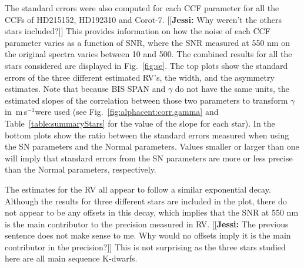 \documentclass{aa}
\def\ms{\hbox{\,m\,s$^{-1}$}}         %
\newcommand{\jessi}[1]{{\color{Purple}[[\textbf{Jessi: }#1]]}}
\begin{document}
The standard errors were also computed for each CCF parameter for all the CCFs of HD215152, HD192310 and Corot-7. \jessi{Why weren't the others stars included?}
This provides information on how the noise of each CCF parameter varies as a function of SNR, where the SNR measured at 550 nm on the original spectra varies between 10 and 500. 
The combined results for all the stars considered are displayed in Fig.~\ref{fig:se}. 
The top plots show the standard errors of the three different estimated RV's, the width, and the asymmetry estimates. 
Note that because BIS SPAN and $\gamma$ do not have the same units, the estimated slopes of the correlation between those two parameters to transform $\gamma$ in \ms were used (see Fig.~\ref{fig:alphacent:corr.gamma} and Table~\ref{table:summaryStars} for the value of the slope for each star). 
In the bottom plots show the ratio between the standard errors measured when using the SN parameters and the Normal parameters. Values smaller or larger than one will imply that standard errors from the SN parameters are more or less precise than the Normal parameters, respectively.

The estimates for the RV all appear to follow a similar exponential decay. Although the results for three different stars are included in the plot, there do not appear to be any offsets in this decay, which implies that the SNR at 550 nm is the main contributor to the precision measured in RV. \jessi{The previous sentence does not make sense to me.  Why would no offsets imply it is the main contributor in the precision?}
This is not surprising as the three stars studied here are all main sequence K-dwarfs. 
\end{document}
